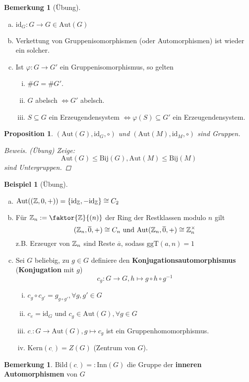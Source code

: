 \documentclass[a4paper]{report}
\theoremstyle{plain}
\newtheorem{prop}[thm]{Proposition}
\theoremstyle{definition}
\newtheorem{bem}[thm]{Bemerkung}
\newtheorem*{bem*}{Bemerkung}
\newtheorem{bsp}[thm]{Beispiel}
\begin{document}
\begin{bem}[Übung]
  \begin{enumerate}[(a)]
    \item $\mathrm{id}_{G} : G \to G \in \mathrm{Aut}(G)$
    \item Verkettung von Gruppenisomorphismen (oder Automorphismen) ist wieder ein solcher.
    \item Ist $\varphi : G \to G'$ ein Gruppenisomorphismus, so gelten
          \begin{enumerate}[(i)]
            \item $\#G = \#G'$.
            \item $G$ abelsch $\iff G'$ abelsch.
            \item $S \subseteq G$ ein Erzeugendensystem $\iff \varphi(S) \subseteq G'$ ein Erzeugendensystem.
          \end{enumerate}
  \end{enumerate}
\end{bem}


\begin{prop} $(\mathrm{Aut}(G), \mathrm{id}_{G}, \circ)$ und $(\mathrm{Aut}(M), \mathrm{id}_{M}, \circ)$ sind Gruppen.
  \begin{proof}[Beweis](Übung) Zeige: $$\mathrm{Aut}(G) \le \mathrm{Bij}(G) , \mathrm{Aut}(M) \le \mathrm{Bij}(M)$$
sind Untergruppen.
  \end{proof}
\end{prop}

\begin{bsp}[Übung]\item
  \begin{enumerate}[(a)]
    \item $\mathrm{Aut}((\Bbb Z, 0, +)) = \{\mathrm{id}_{\Bbb Z}, - \mathrm{id}_{\Bbb Z}\} \cong C_{2}$
    \item Für $\Bbb Z_{n}:= \faktor{\Bbb Z}{(n)}$ der Ring der Restklassen modulo $n$ gilt
          $$(\Bbb Z_{n}, \overline 0, +) \cong C_{n} \text{ und } \mathrm{Aut}(\Bbb Z_{n}, \overline 0, +) \cong \Bbb Z_{n}^{\times}$$
          z.B. Erzeuger von $\Bbb Z_{n}$ sind Reste $\overline a$, sodass $\mathrm{ggT}(a,n) = 1$
    \item Sei $G$ beliebig, zu $g \in G$ definiere den \textbf{Konjugationsautomorphismus} (\textbf{Konjugation} mit $g$)
          $$c_{g}: G \to G, h \mapsto g\circ h \circ g^{-1}$$
\begin{enumerate}[(i)]
  \item $c_{g} \circ c_{g'} = g_{g\circ g'}, \forall g, g' \in G$
  \item $c_{e} = \mathrm{id}_{G}$ und $c_{g} \in \mathrm{Aut}(G), \forall g \in G$
  \item $c_{\cdot}: G \to \mathrm{Aut}(G), g \mapsto c_{g}$ ist ein Gruppenhomomorphismus.
  \item $\mathrm{Kern}(c_{\cdot}) = Z(G)$ (Zentrum von $G$).
\end{enumerate}
  \end{enumerate}
\end{bsp}
\begin{bem*}
$\mathrm{Bild}(c_{\cdot}) =: \mathrm{Inn}(G)$ die Gruppe der \textbf{inneren Automorphismen} von $G$
\end{bem*}
\end{document}
